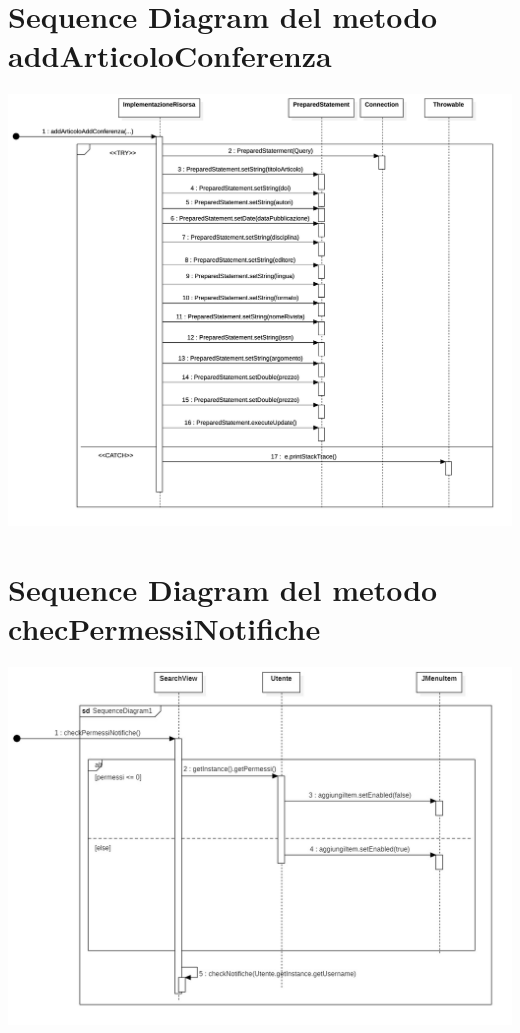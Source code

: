 \section{Sequence Diagram del metodo addArticoloConferenza}
\includegraphics[scale=0.15, center]{Immagini/AddArtConf_SD.png}

\section{Sequence Diagram del metodo checPermessiNotifiche}
\includegraphics[scale=0.28, center]{Immagini/checkPermNot_SD.jpg}
